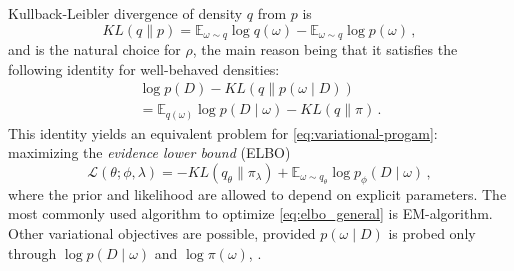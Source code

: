 \documentclass[a4paper,10pt]{article}
\begin{document}
Kullback-Leibler divergence of density $q$ from $p$ is
\begin{equation}  \label{eq:kl-div-def}
  KL(q \| p)
    = \mathbb{E}_{\omega \sim q}
      \log{q(\omega)}
    - \mathbb{E}_{\omega \sim q}
      \log{p(\omega)}
    \,,
\end{equation}
and is the natural choice for $\rho$, the main reason being that it satisfies the following
identity for well-behaved densities:
\begin{multline}  \label{eq:kl-div-master}
  \log p(D)
    - KL(q \| p(\omega \mid D))
    \\ = \mathbb{E}_{q(\omega)} \log{p(D \mid \omega)}
    - KL(q \| \pi)
    \,.
\end{multline}
This identity yields an equivalent problem for \eqref{eq:variational-progam}:
maximizing the \textit{evidence lower bound} (ELBO)
\begin{equation}  \label{eq:elbo_general}
  \mathcal{L}(\theta; \phi, \lambda)
    = - KL(q_{\theta} \| \pi_{\lambda})
      + \mathbb{E}_{\omega \sim q_{\theta}}
        \log p_{\phi}(D \mid \omega)
  \,,
\end{equation}
where the prior and likelihood are allowed to depend on explicit parameters. The most
commonly used algorithm to optimize \eqref{eq:elbo_general} is EM-algorithm. Other
variational objectives are possible, provided $p(\omega \mid D)$ is probed only through
$\log p(D \mid \omega)$ and $\log \pi(\omega)$, \citep{ranganath_operator_2018}.
\end{document}
